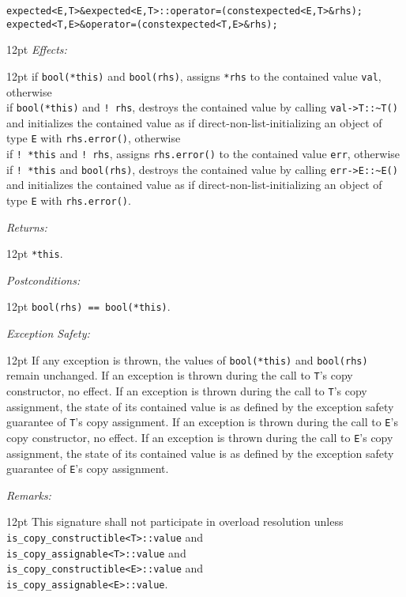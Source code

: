 \documentclass[a4paper,10pt]{article}
\newcommand{\cpp}[1]{\lstinline{#1}}
\newcommand{\wordingItem}[1]{\noindent\textit{#1:}}
\newenvironment{wordingTextItem}[1]{\wordingItem{#1}\vspace{2pt}\noindent\begin{adjustwidth}{12pt}{}}{\vspace{2pt}\end{adjustwidth}}
\newenvironment{wordingPara}{\begin{adjustwidth}{12pt}{}}{\end{adjustwidth}}
\newcommand{\suppress}[1]{\colorbox{suppress_color}{#1}}
\newcommand{\update}[1]{\colorbox{update_color}{#1}}
\begin{document}
\begin{alltt}
\suppress{expected<E,T>& expected<E,T>::operator=(const expected<E,T>& rhs); }
\update{expected<T,E>& operator=(const expected<T,E>& rhs); }
\end{alltt}
\begin{wordingPara}
\begin{wordingTextItem}{Effects}
if \cpp{bool(*this)} and \cpp{bool(rhs)}, assigns \cpp{*rhs} to the contained value \cpp{val}, otherwise \\
if \cpp{bool(*this)} and \cpp{! rhs}, destroys the contained value by calling \cpp{val->T::~T()} and  initializes the contained value as if direct-non-list-initializing an object of type \cpp{E} with \cpp{rhs.error()}, otherwise \\
if \cpp{! *this} and \cpp{! rhs}, assigns \cpp{rhs.error()} to the contained value \cpp{err}, otherwise \\
if \cpp{! *this} and \cpp{bool(rhs)}, destroys the contained value by calling \cpp{err->E::~E()} and  initializes the contained value as if direct-non-list-initializing an object of type \cpp{E} with \cpp{rhs.error()}.
\end{wordingTextItem}
\begin{wordingTextItem}{Returns}
\cpp{*this}.
\end{wordingTextItem}
\begin{wordingTextItem}{Postconditions}
\cpp{bool(rhs) == bool(*this)}.
\end{wordingTextItem}
\begin{wordingTextItem}{Exception Safety}
If any exception is thrown, the values of \cpp{bool(*this)} and \cpp{bool(rhs)} remain unchanged. If an exception is thrown during the call to \cpp{T}'s copy constructor, no effect. If an exception is thrown during the call to \cpp{T}'s copy assignment, the state of its contained value is as defined by the exception safety guarantee of \cpp{T}'s copy assignment. If an exception is thrown during the call to \cpp{E}'s copy constructor, no effect. If an exception is thrown during the call to \cpp{E}'s copy assignment, the state of its contained value is as defined by the exception safety guarantee of \cpp{E}'s copy assignment.
\end{wordingTextItem}
\begin{wordingTextItem}{Remarks}
This signature shall not participate in overload resolution unless\\
\cpp{is_copy_constructible<T>::value} and\\
\cpp{is_copy_assignable<T>::value} and\\
\cpp{is_copy_constructible<E>::value} and\\
\cpp{is_copy_assignable<E>::value}.
\end{wordingTextItem}

\end{wordingPara}
\end{document}
